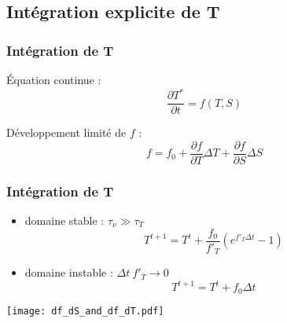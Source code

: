 \subsection{Intégration explicite de T}

\begin{frame}
\frametitle{Intégration de T}

\'Equation continue :
$$ \frac{\partial T^*}{\partial t} = f(T,S)$$

Développement limité de $f$ :
$$ f = f_0 + \frac{\partial f}{\partial T} \Delta T + \frac{\partial f}{\partial S} \Delta S$$

\end{frame}

\begin{frame}
\frametitle{Intégration de T}
\begin{itemize}

\item domaine stable : $\tau_{\nu} \gg \tau_T$ 
$$T^{t+1} = T^t + \frac{f_0}{f'_T} \left( e^{f'_T \Delta t} - 1 \right) $$

\item domaine instable : $\Delta t\ f'_T \rightarrow 0$
$$T^{t+1} = T^t + f_0 \Delta t$$

\end{itemize}
\end{frame}

\begin{frame}
    \begin{center}
    \texttt{[image: df\_dS\_and\_df\_dT.pdf]}
    \end{center}
\end{frame}
